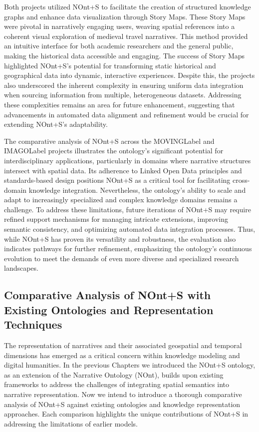 Both projects utilized NOnt+S to facilitate the creation of structured knowledge graphs and enhance data visualization through Story Maps. These Story Maps were pivotal in narratively engaging users, weaving spatial references into a coherent visual exploration of medieval travel narratives. This method provided an intuitive interface for both academic researchers and the general public, making the historical data accessible and engaging. The success of Story Maps highlighted NOnt+S’s potential for transforming static historical and geographical data into dynamic, interactive experiences. Despite this, the projects also underscored the inherent complexity in ensuring uniform data integration when sourcing information from multiple, heterogeneous datasets. Addressing these complexities remains an area for future enhancement, suggesting that advancements in automated data alignment and refinement would be crucial for extending NOnt+S’s adaptability.

The comparative analysis of NOnt+S across the \acrshort{MOVINGLabel} and \acrshort{IMAGOLabel} projects illustrates the ontology’s significant potential for interdisciplinary applications, particularly in domains where narrative structures intersect with spatial data. Its adherence to Linked Open Data principles and standards-based design positions NOnt+S as a critical tool for facilitating cross-domain knowledge integration. Nevertheless, the ontology’s ability to scale and adapt to increasingly specialized and complex knowledge domains remains a challenge. To address these limitations, future iterations of NOnt+S may require refined support mechanisms for managing intricate extensions, improving semantic consistency, and optimizing automated data integration processes. Thus, while NOnt+S has proven its versatility and robustness, the evaluation also indicates pathways for further refinement, emphasizing the ontology’s continuous evolution to meet the demands of even more diverse and specialized research landscapes.

\subsection{Comparative Analysis of NOnt+S with Existing Ontologies and Representation Techniques}

The representation of narratives and their associated geospatial and temporal dimensions has emerged as a critical concern within knowledge modeling and digital humanities. In the previous Chapters we introduced the NOnt+S ontology, as an extension of the Narrative Ontology (NOnt), builds upon existing frameworks to address the challenges of integrating spatial semantics into narrative representation. Now we intend to introduce a thorough comparative analysis of NOnt+S against existing ontologies and knowledge representation approaches. Each comparison highlights the unique contributions of NOnt+S in addressing the limitations of earlier models.

